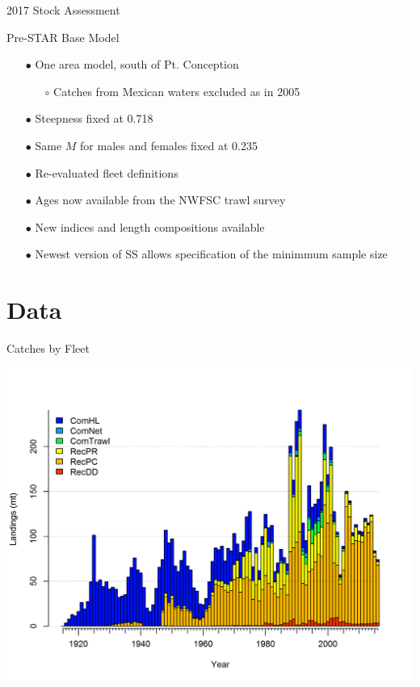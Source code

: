 \documentclass[ignorenonframetext,]{beamer}
\begin{document}
\begin{frame}{2017 Stock Assessment}

Pre-STAR Base Model

\begin{itemize}
\item[$\bullet$] One area model, south of Pt. Conception 
\begin{itemize}
\item[$\circ$] Catches from Mexican waters excluded as in 2005
\end{itemize}
\item[$\bullet$] Steepness fixed at 0.718
\item[$\bullet$] Same $M$ for males and females fixed at 0.235
\item[$\bullet$] Re-evaluated fleet definitions
\item[$\bullet$] Ages now available from the NWFSC trawl survey
\item[$\bullet$] New indices and length compositions available
\item[$\bullet$] Newest version of SS allows specification of the minimmum sample size
\end{itemize}

\end{frame}

\section{Data}\label{data}

\begin{frame}{Catches by Fleet}

\centering
\includegraphics{r4ss/plots_mod1/catch2 landings stacked.png}

\end{frame}
\end{document}
